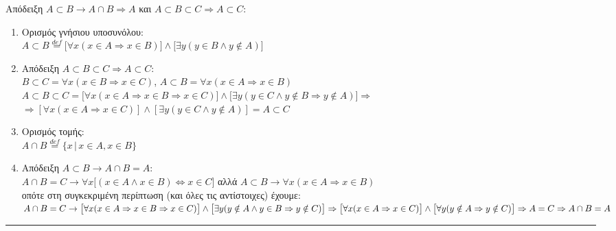 Απόδειξη $A \subset B \rightarrow A \cap B \Rightarrow A$ και $A \subset B \subset C \Rightarrow A \subset C$:
\begin{enumerate}
	\item Ορισμός γνήσιου υποσυνόλου:\\
	$Α\subset B \overset{def}{=}  \bigl[\forall x(x\in A \Rightarrow x\in B)\bigr]\land \bigl[\exists y(y\in B
	\land y\notin A)\bigr]$

	 \item Απόδειξη $A \subset B \subset C \Rightarrow A\subset C$:\\
	 $B\subset C = \forall x(x\in B \Rightarrow x\in C)$,\qquad
	 $A\subset B = \forall x(x\in A \Rightarrow x\in B)$\\
	 $A \subset B \subset C = \bigl[\forall x(x\in A \Rightarrow x\in B \Rightarrow x\in C)\bigr]\land
	  \bigl[\exists y(y\in C \land y\notin B \Rightarrow y\notin A)\bigr]\Rightarrow$\\
	  $\Rightarrow [\forall x(x\in A \Rightarrow x\in C)]\land [\exists y(y\in C \land y\notin A)] = A\subset C$

	 \item Ορισμός τομής:\\
	 $A\cap B \overset{def}{=}\{x\,|\,x\in A, x\in B\}$

	 \item Απόδειξη $A\subset B \rightarrow A\cap B = A$:\\
	 $A\cap B = C \rightarrow \forall x\bigl[(x\in A \land x\in B)\Leftrightarrow x\in C\bigr]$ αλλά $A\subset B
	 \rightarrow \forall x(x\in A \Rightarrow x\in B)$\\
	 οπότε στη συγκεκριμένη περίπτωση (και όλες τις αντίστοιχες) έχουμε:\\
	 $A\cap B = C \rightarrow \bigl[\forall x(x\in A \Rightarrow x\in B \Rightarrow x\in C)\bigr]\land
	 \bigl[\exists y(y\notin A \land y\in B \Rightarrow y\notin C)\bigr] \Rightarrow\\
	 \bigl[\forall x(x\in A \Rightarrow x\in C)\bigr] \land \bigl[\forall y(y\notin A \Rightarrow y\notin C)\bigr]
	 \Rightarrow A = C
	 \Rightarrow A\cap B = A$

\end{enumerate}


\begin{center}
	\noindent\rule{\linewidth}{0.5pt}
\end{center}
\clearpage